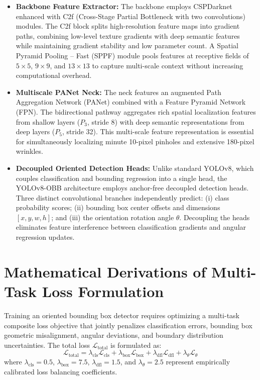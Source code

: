 \begin{itemize}
\item \textbf{Backbone Feature Extractor:} The backbone employs CSPDarknet enhanced with C2f (Cross-Stage Partial Bottleneck with two convolutions) modules. The C2f block splits high-resolution feature maps into gradient paths, combining low-level texture gradients with deep semantic features while maintaining gradient stability and low parameter count. A Spatial Pyramid Pooling -- Fast (SPPF) module pools features at receptive fields of $5 \times 5$, $9 \times 9$, and $13 \times 13$ to capture multi-scale context without increasing computational overhead.
\item \textbf{Multiscale PANet Neck:} The neck features an augmented Path Aggregation Network (PANet) combined with a Feature Pyramid Network (FPN). The bidirectional pathway aggregates rich spatial localization features from shallow layers ($P_3$, stride 8) with deep semantic representations from deep layers ($P_5$, stride 32). This multi-scale feature representation is essential for simultaneously localizing minute 10-pixel pinholes and extensive 180-pixel wrinkles.
\item \textbf{Decoupled Oriented Detection Heads:} Unlike standard YOLOv8, which couples classification and bounding regression into a single head, the YOLOv8-OBB architecture employs anchor-free decoupled detection heads. Three distinct convolutional branches independently predict: (i) class probability scores; (ii) bounding box center offsets and dimensions $[x, y, w, h]$; and (iii) the orientation rotation angle $\theta$. Decoupling the heads eliminates feature interference between classification gradients and angular regression updates.
\end{itemize}

\section{Mathematical Derivations of Multi-Task Loss Formulation}
\label{sec:loss}

Training an oriented bounding box detector requires optimizing a multi-task composite loss objective that jointly penalizes classification errors, bounding box geometric misalignment, angular deviations, and boundary distribution uncertainties. The total loss $\mathcal{L}_{\text{total}}$ is formulated as:
\begin{equation}
\label{eq:total_loss}
\mathcal{L}_{\text{total}} = \lambda_{\text{cls}} \mathcal{L}_{\text{cls}} + \lambda_{\text{box}} \mathcal{L}_{\text{box}} + \lambda_{\text{dfl}} \mathcal{L}_{\text{dfl}} + \lambda_{\theta} \mathcal{L}_{\theta}
\end{equation}
where $\lambda_{\text{cls}} = 0.5$, $\lambda_{\text{box}} = 7.5$, $\lambda_{\text{dfl}} = 1.5$, and $\lambda_{\theta} = 2.5$ represent empirically calibrated loss balancing coefficients.

